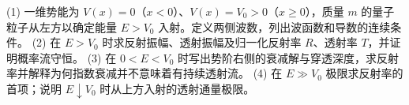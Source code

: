 (1) 一维势能为 \(V(x)=0\)（\(x<0\)）、\(V(x)=V_0>0\)（\(x\ge0\)），质量 \(m\) 的量子粒子从左方以确定能量 \(E>V_0\) 入射。定义两侧波数，列出波函数和导数的连续条件。
(2) 在 \(E>V_0\) 时求反射振幅、透射振幅及归一化反射率 \(R\)、透射率 \(T\)，并证明概率流守恒。
(3) 在 \(0<E<V_0\) 时写出势阶右侧的衰减解与穿透深度，求反射率并解释为何指数衰减并不意味着有持续透射流。
(4) 在 \(E\gg V_0\) 极限求反射率的首项；说明 \(E\downarrow V_0\) 时从上方入射的透射通量极限。
